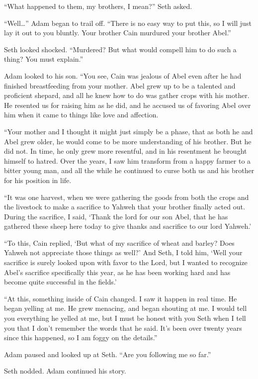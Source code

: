\documentclass[12pt,twoside,titlepage]{report}
\begin{document}
``What happened to them, my brothers, I mean?'' Seth asked.

``Well\ldots{}'' Adam began to trail off. ``There is no easy way to put
this, so I will just lay it out to you bluntly. Your brother Cain
murdured your brother Abel.''

Seth looked shocked. ``Murdered? But what would compell him to do such a
thing? You must explain.''

Adam looked to his son. ``You see, Cain was jealous of Abel even after
he had finished breastfeeding from your mother. Abel grew up to be a
talented and proficient shepard, and all he knew how to do was gather
crops with his mother. He resented us for raising him as he did, and he
accused us of favoring Abel over him when it came to things like love
and affection.

``Your mother and I thought it might just simply be a phase, that as
both he and Abel grew older, he would come to be more understanding of
his brother. But he did not. In time, he only grew more resentful, and
in his resentment he brought himself to hatred. Over the years, I saw
him transform from a happy farmer to a bitter young man, and all the
while he continued to curse both us and his brother for his position in
life.

``It was one harvest, when we were gathering the goods from both the
crops and the livestock to make a sacrifice to Yahweh that your brother
finally acted out. During the sacrifice, I said, `Thank the lord for our
son Abel, that he has gathered these sheep here today to give thanks and
sacrifice to our lord Yahweh.'

``To this, Cain replied, `But what of my sacrifice of wheat and barley?
Does Yahweh not appreciate those things as well?' And Seth, I told him,
`Well your sacrifice is surely looked upon with favor to the Lord, but I
wanted to recognize Abel's sacrifice specifically this year, as he has
been working hard and has become quite successful in the fields.'

``At this, something inside of Cain changed. I saw it happen in real
time. He began yelling at me. He grew menacing, and began shouting at
me. I would tell you everything he yelled at me, but I must be honest
with you Seth when I tell you that I don't remember the words that he
said. It's been over twenty years since this happened, so I am foggy on
the details.''

Adam paused and looked up at Seth. ``Are you following me so far.''

Seth nodded. Adam continued his story.
\end{document}

